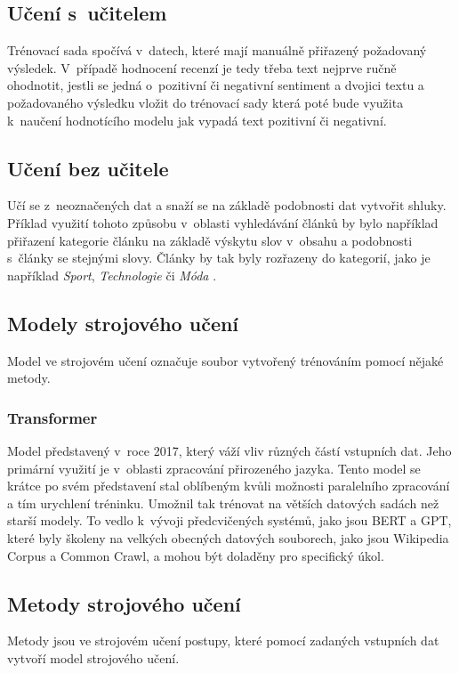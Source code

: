 \subsection*{Učení s~učitelem}
Trénovací sada spočívá v~datech, které mají manuálně přiřazený požadovaný výsledek. V~případě hodnocení recenzí je tedy třeba text nejprve ručně ohodnotit, jestli se jedná o~pozitivní či negativní sentiment a dvojici textu a požadovaného výsledku vložit do trénovací sady která poté bude využita k~naučení hodnotícího modelu jak vypadá text pozitivní či negativní\cite{FITBT22452}.

\subsection*{Učení bez učitele}
Učí se z~neoznačených dat a snaží se na základě podobnosti dat vytvořit shluky. Příklad využití tohoto způsobu v~oblasti vyhledávání článků by bylo například přiřazení kategorie článku na základě výskytu slov v~obsahu a podobnosti s~články se stejnými slovy. Články by tak byly rozřazeny do kategorií, jako je například \textit{Sport}, \textit{Technologie} či \textit{Móda} \cite{FITBT22452}\cite{goel_2018}.

\subsection*{Modely strojového učení}
Model ve strojovém učení označuje soubor vytvořený trénováním pomocí nějaké metody\cite{brownlee_2020}.

\subsubsection*{Transformer}
\label{transformer}
Model představený v~roce 2017, který váží vliv různých částí vstupních dat. Jeho primární využití je v~oblasti zpracování přirozeného jazyka. Tento model se krátce po svém představení stal oblíbeným kvůli možnosti paralelního zpracování a tím urychlení tréninku. Umožnil tak trénovat na větších datových sadách než starší modely. To vedlo k~vývoji předcvičených systémů, jako jsou BERT a GPT, které byly školeny na velkých obecných datových souborech, jako jsou Wikipedia Corpus a Common Crawl, a mohou být doladěny pro specifický úkol\cite{vaswani2017attention}.

\subsection*{Metody strojového učení}
Metody jsou ve strojovém učení postupy, které pomocí zadaných vstupních dat vytvoří model strojového učení\cite{brownlee_2020}.

